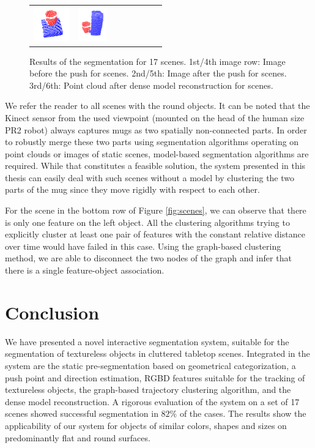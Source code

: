 \begin{figure}[h!]
\begin{tabular}{cccccccc}
    \includegraphics[height=1.5cm]{pictures/163.png}&
    \includegraphics[height=1.5cm]{pictures/173.png}\\
    \end{tabular}
    	\caption{Results  of the  segmentation for  17  scenes.  1st/4th
          image row:  Image before  the push  for scenes.   2nd/5th:
          Image after the push for scenes.  3rd/6th: Point cloud
          after dense model reconstruction for scenes.}
    \label{fig:evaluation1}
\end{figure}

We refer the  reader to all scenes with
the round objects. 
It can be noted that
the Kinect sensor from the used viewpoint (mounted on the head of the human size PR2 robot) always
captures mugs as two spatially non-connected parts.
In order to robustly merge these two parts using segmentation
algorithms operating on point clouds or images of static scenes, 
model-based segmentation algorithms are required. While that constitutes a feasible solution,
the system presented in this
thesis can easily deal with such scenes without a model by clustering the two
parts of the mug since they move rigidly with respect to each other.

 For  the scene in the bottom row  of Figure \ref{fig:scenes},  we can  observe that
 there is only one feature on the left object.  All   the  clustering  algorithms  trying  to
 explicitly cluster  at least one  pair of features with  the constant
 relative  distance over  time would have failed  in this  case.  Using  the
 graph-based clustering method, we are able to disconnect the two nodes
 of  the  graph  and infer  that  there  is a single feature-object association.



\section{Conclusion}
\label{sec:conclusion}
We have  presented a novel interactive segmentation  system, suitable for
the segmentation of textureless  objects in cluttered tabletop scenes.
Integrated  in the  system are  the static  pre-segmentation  based on
geometrical   categorization,  a  push   point and direction estimation, 
RGBD features  suitable for the tracking of
textureless objects,  the graph-based trajectory  clustering algorithm,
and the  dense model reconstruction.  A rigorous  evaluation of the
system on a  set of 17 scenes showed successful segmentation in $82\%$ of the cases.  
The results show the applicability of our system
for objects of similar colors,  shapes and sizes on predominantly flat
and  round surfaces.  